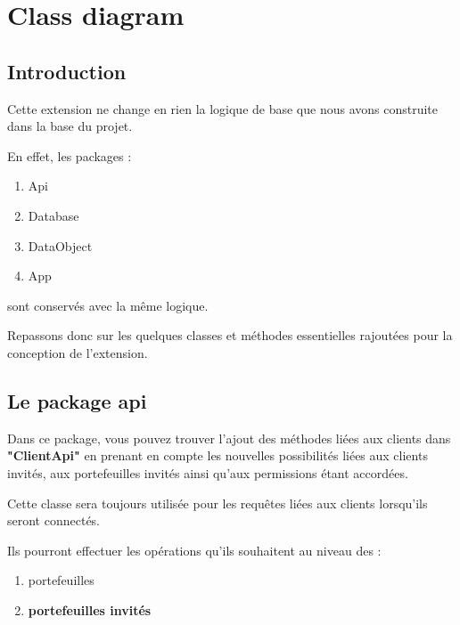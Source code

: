 \section{Class diagram}
\subsection{Introduction}
\begin{flushleft}
Cette extension ne change en rien la logique de base que nous avons construite dans la base du projet.
\end{flushleft}

\begin{flushleft}
En effet, les packages : 
\end{flushleft}
\begin{enumerate}
\item Api
\item Database
\item DataObject
\item App
\end{enumerate}
\begin{flushleft}
sont conservés avec la même logique.
\end{flushleft}

\begin{flushleft}
Repassons donc sur les quelques classes et méthodes essentielles rajoutées pour la conception de l'extension.
\end{flushleft}

\subsection{Le package api}
\begin{flushleft}
Dans ce package, vous pouvez trouver l'ajout des méthodes liées aux clients dans \textbf{"ClientApi"} en prenant en compte les nouvelles possibilités liées aux clients invités, aux portefeuilles invités ainsi qu'aux permissions étant accordées.
\end{flushleft}

\begin{flushleft}
Cette classe sera toujours utilisée pour les requêtes liées aux clients lorsqu'ils seront connectés.
\end{flushleft}

\begin{flushleft}
Ils pourront effectuer les opérations qu'ils souhaitent au niveau des :
\end{flushleft}
\begin{enumerate}
\item portefeuilles
\item \textbf{portefeuilles invités}
\end{enumerate}

